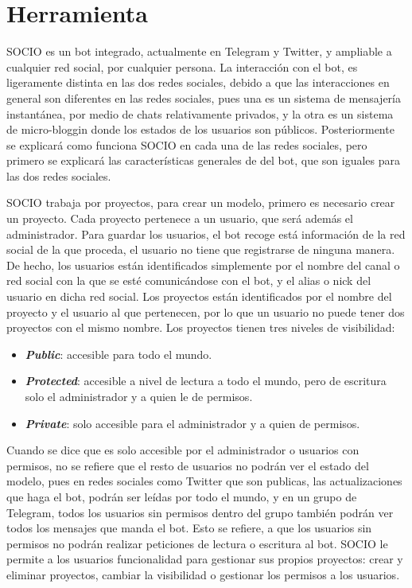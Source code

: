 \chapter{Herramienta\label{sec:Herramienta}}
SOCIO es un bot integrado, actualmente en Telegram y Twitter, y ampliable a cualquier red social, por cualquier persona. La interacción con el bot, es ligeramente distinta en las dos redes sociales, debido a que las interacciones en general son diferentes en las redes sociales, pues una es un sistema de mensajería instantánea, por medio de chats relativamente privados, y la otra es un sistema de micro-bloggin donde los estados de los usuarios son públicos. Posteriormente se explicará como funciona SOCIO en cada una de las redes sociales, pero primero se explicará las características generales de del bot, que son iguales para las dos redes sociales. 

SOCIO trabaja por proyectos, para crear un modelo, primero es necesario crear un proyecto. Cada proyecto pertenece a un usuario, que será además el administrador. Para guardar los usuarios, el bot recoge está información de la red social de la que proceda, el usuario no tiene que registrarse de ninguna manera. De hecho, los usuarios están identificados simplemente por el nombre del canal o red social con la que se esté comunicándose con el bot, y el alias o nick del usuario en dicha red social. Los proyectos están identificados por el nombre del proyecto y el usuario al que pertenecen, por lo que un usuario no puede tener dos proyectos con el mismo nombre. Los proyectos tienen tres niveles de visibilidad: 
\begin{itemize}
\item \textbf{\textit{Public}}: accesible para todo el mundo.
\item \textbf{\textit{Protected}}: accesible a nivel de lectura a todo el mundo, pero de escritura solo el administrador y a quien le de permisos.
\item \textbf{\textit{Private}}: solo accesible para el administrador y a quien de permisos. 
\end{itemize}

Cuando se dice que es solo accesible por el administrador o usuarios con permisos, no se refiere que el resto de usuarios no podrán ver el estado del modelo, pues en redes sociales como Twitter que son publicas, las actualizaciones que haga el bot, podrán ser leídas por todo el mundo, y en un grupo de Telegram, todos los usuarios sin permisos dentro del grupo también podrán ver todos los mensajes que manda el bot. Esto se refiere, a que los usuarios sin permisos no podrán realizar peticiones de lectura o escritura al bot.  
SOCIO le permite a los usuarios funcionalidad para gestionar sus propios proyectos: crear y eliminar proyectos, cambiar la visibilidad o gestionar los permisos a los usuarios. 

